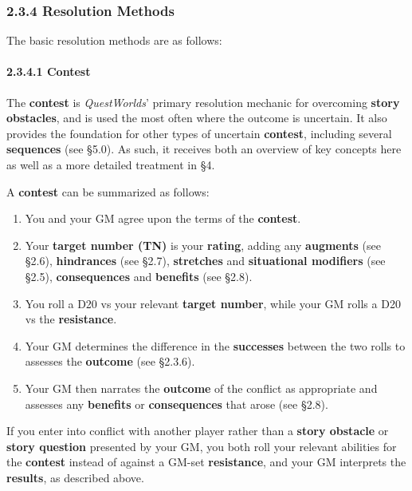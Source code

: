 \documentclass[
  11pt,
]{article}
\providecommand{\tightlist}{%
  \setlength{\itemsep}{0pt}\setlength{\parskip}{0pt}}
\begin{document}
\hypertarget{resolution-methods}{%
\subsubsection{2.3.4 Resolution Methods}\label{resolution-methods}}

The basic resolution methods are as follows:

\hypertarget{contest}{%
\paragraph{2.3.4.1 Contest}\label{contest}}

The \textbf{contest} is \emph{QuestWorlds}' primary resolution mechanic
for overcoming \textbf{story obstacles}, and is used the most often
where the outcome is uncertain. It also provides the foundation for
other types of uncertain \textbf{contest}, including several
\textbf{sequences} (see §5.0). As such, it receives both an overview of
key concepts here as well as a more detailed treatment in §4.

A \textbf{contest} can be summarized as follows:

\begin{enumerate}
\def\labelenumi{\arabic{enumi}.}
\tightlist
\item
  You and your GM agree upon the terms of the \textbf{contest}.
\item
  Your \textbf{target number (TN)} is your \textbf{rating}, adding any
  \textbf{augments} (see §2.6), \textbf{hindrances} (see §2.7),
  \textbf{stretches} and \textbf{situational modifiers} (see §2.5),
  \textbf{consequences} and \textbf{benefits} (see §2.8).
\item
  You roll a D20 vs your relevant \textbf{target number}, while your GM
  rolls a D20 vs the \textbf{resistance}.
\item
  Your GM determines the difference in the \textbf{successes} between
  the two rolls to assesses the \textbf{outcome} (see §2.3.6).
\item
  Your GM then narrates the \textbf{outcome} of the conflict as
  appropriate and assesses any \textbf{benefits} or
  \textbf{consequences} that arose (see §2.8).
\end{enumerate}

If you enter into conflict with another player rather than a
\textbf{story obstacle} or \textbf{story question} presented by your GM,
you both roll your relevant abilities for the \textbf{contest} instead
of against a GM-set \textbf{resistance}, and your GM interprets the
\textbf{results}, as described above.
\end{document}

